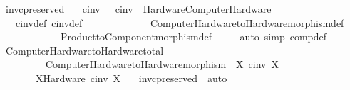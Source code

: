 \begin{isabellebody}
\begin{isamarkuptext}
\begin{isarbox}
\begin{isabelle}
\ inv{\isacharunderscore}{\kern0pt}c{}{\isacharunderscore}{\kern0pt}preserved\ {\isacharcolon}{\kern0pt}\isanewline
\ \ {\isachardoublequoteopen}c{}{\isacharunderscore}{\kern0pt}inv\ {\isasymsigma}\ {\isasymLongrightarrow}\ c{}{\isacharunderscore}{\kern0pt}inv\ {\isacharparenleft}{\kern0pt}{\isasymsigma}\ {\isasymlangle}Hardware{\isasymrangle}\isactrlsub C\isactrlsub o\isactrlsub m\isactrlsub p\isactrlsub u\isactrlsub t\isactrlsub e\isactrlsub r\isactrlsub H\isactrlsub a\isactrlsub r\isactrlsub d\isactrlsub w\isactrlsub a\isactrlsub r\isactrlsub e{\isacharparenright}{\kern0pt}{\isachardoublequoteclose}\isanewline
\ \ \ c{}{\isacharunderscore}{\kern0pt}inv{\isacharunderscore}{\kern0pt}def\ c{}{\isacharunderscore}{\kern0pt}inv{\isacharunderscore}{\kern0pt}def\ \isanewline
\ \ \ \ \ \ \ \ \ \ \ \ Computer{\isacharunderscore}{\kern0pt}Hardware{\isacharunderscore}{\kern0pt}to{\isacharunderscore}{\kern0pt}Hardware{\isacharunderscore}{\kern0pt}morphism{\isacharunderscore}{\kern0pt}def\isanewline
\ \ \ \ \ \ \ \ \ \ \ \ Product{\isacharunderscore}{\kern0pt}to{\isacharunderscore}{\kern0pt}Component{\isacharunderscore}{\kern0pt}morphism{\isacharunderscore}{\kern0pt}def\ \ \isanewline
\ \ \ {\isacharparenleft}{\kern0pt}auto\ simp{\isacharcolon}{\kern0pt}\ comp{\isacharunderscore}{\kern0pt}def{\isacharparenright}{\kern0pt}\isanewline
\isanewline
{}\ Computer{\isacharunderscore}{\kern0pt}Hardware{\isacharunderscore}{\kern0pt}to{\isacharunderscore}{\kern0pt}Hardware{\isacharunderscore}{\kern0pt}total\ {\isacharcolon}{\kern0pt}\isanewline
\ \ \ \ \ \ \ \ \ {\isachardoublequoteopen}Computer{\isacharunderscore}{\kern0pt}Hardware{\isacharunderscore}{\kern0pt}to{\isacharunderscore}{\kern0pt}Hardware{\isacharunderscore}{\kern0pt}morphism\ {\isacharbackquote}{\kern0pt}\ {\isacharparenleft}{\kern0pt}{\isacharbraceleft}{\kern0pt}X{\isachardot}{\kern0pt}\ c{}{\isacharunderscore}{\kern0pt}inv\ X{\isacharbraceright}{\kern0pt}{\isacharparenright}{\kern0pt}\ \isanewline
\ \ \ \ \ \ {\isasymsubseteq}\ {\isacharparenleft}{\kern0pt}{\isacharbraceleft}{\kern0pt}X{\isacharcolon}{\kern0pt}{\isacharcolon}{\kern0pt}Hardware{\isachardot}{\kern0pt}\ c{}{\isacharunderscore}{\kern0pt}inv\ X{\isacharbraceright}{\kern0pt}{\isacharparenright}{\kern0pt}{\isachardoublequoteclose}\isanewline
\ \ \ inv{\isacharunderscore}{\kern0pt}c{}{\isacharunderscore}{\kern0pt}preserved\ \ auto
\end{isabelle}
\end{isarbox}


\end{isamarkuptext}
\end{isabellebody}
